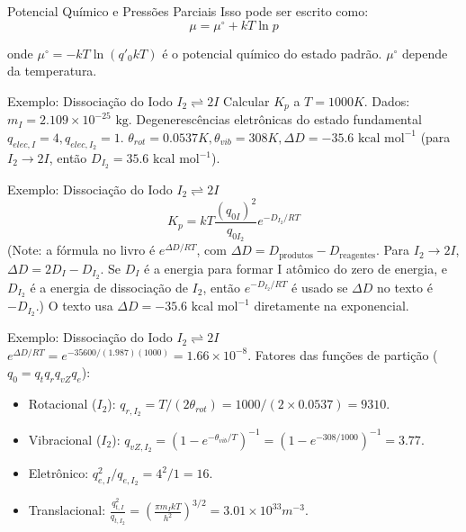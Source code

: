 \documentclass{beamer}
\begin{document}
\begin{frame}{Potencial Químico e Pressões Parciais}
        Isso pode ser escrito como:
        $$ \mu = \mu^{\circ} + kT \ln p $$
        
        onde $\mu^{\circ} = -kT \ln(q'_0 kT)$ é o potencial químico do estado padrão. $\mu^{\circ}$ depende da temperatura.
\end{frame}

\begin{frame}{Exemplo: Dissociação do Iodo $I_2 \rightleftharpoons 2I$}
    Calcular $K_p$ a $T=1000K$.
    Dados: $m_I = 2.109 \times 10^{-25} \text{ kg}$. Degenerescências eletrônicas do estado fundamental $q_{elec,I}=4, q_{elec,I_2}=1$. $\theta_{rot}=0.0537K, \theta_{vib}=308K, \Delta D = -35.6 \text{ kcal mol}^{-1}$ (para $I_2 \rightarrow 2I$, então $D_{I_2} = 35.6 \text{ kcal mol}^{-1}$).


\end{frame}

\begin{frame}{Exemplo: Dissociação do Iodo $I_2 \rightleftharpoons 2I$}
    $$ K_p = kT \frac{(q_{0I})^2}{q_{0I_2}} e^{-D_{I_2}/RT} $$
    (Note: a fórmula no livro é $e^{\Delta D/RT}$, com $\Delta D = D_{\text{produtos}} - D_{\text{reagentes}}$. Para $I_2 \rightarrow 2I$, $\Delta D = 2D_I - D_{I_2}$. Se $D_I$ é a energia para formar I atômico do zero de energia, e $D_{I_2}$ é a energia de dissociação de $I_2$, então $e^{-D_{I_2}/RT}$ é usado se $\Delta D$ no texto é $-D_{I_2}$.) O texto usa $\Delta D = -35.6 \text{ kcal mol}^{-1}$ diretamente na exponencial.

\end{frame}

\begin{frame}{Exemplo: Dissociação do Iodo $I_2 \rightleftharpoons 2I$}
    $e^{\Delta D/RT} = e^{-35600/(1.987)(1000)} = 1.66 \times 10^{-8}$. 
    Fatores das funções de partição ($q_0 = q_t q_r q_{vZ} q_e$):
    \begin{itemize}
        \item Rotacional ($I_2$): $q_{r,I_2} = T/(2\theta_{rot}) = 1000/(2 \times 0.0537) = 9310$.
        \item Vibracional ($I_2$): $q_{vZ,I_2} = (1-e^{-\theta_{vib}/T})^{-1} = (1-e^{-308/1000})^{-1} = 3.77$.
        \item Eletrônico: $q_{e,I}^2/q_{e,I_2} = 4^2/1 = 16$.
        \item Translacional: $\frac{q_{t,I}^2}{q_{t,I_2}} = \left(\frac{\pi m_I kT}{h^2}\right)^{3/2} = 3.01 \times 10^{33} m^{-3}$.
    \end{itemize}
    
\end{frame}
\end{document}
